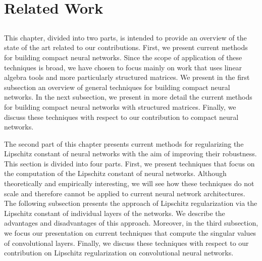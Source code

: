 \chapter{Related Work}
\label{chapter:ch3-related_work}
\localtoc

\section*{}

This chapter, divided into two parts, is intended to provide an overview of the state of the art related to our contributions.
First, we present current methods for building compact neural networks.
Since the scope of application of these techniques is broad, we have chosen to focus mainly on work that uses linear algebra tools and more particularly structured matrices. 
We present in the first subsection an overview of general techniques for building compact neural networks.
In the next subsection, we present in more detail the current methods for building compact neural networks with structured matrices.
Finally, we discuss these techniques with respect to our contribution to compact neural networks.

The second part of this chapter presents current methods for regularizing the Lipschitz constant of neural networks with the aim of improving their robustness.
This section is divided into four parts.
First, we present techniques that focus on the computation of the Lipschitz constant of neural networks.
Although theoretically and empirically interesting, we will see how these techniques do not scale and therefore cannot be applied to current neural network architectures.
The following subsection presents the approach of Lipschitz regularization via the Lipschitz constant of individual layers of the networks.
We describe the advantages and disadvantages of this approach.
Moreover, in the third subsection, we focus our presentation on current techniques that compute the singular values of convolutional layers.
Finally, we discuss these techniques with respect to our contribution on Lipschitz regularization on convolutional neural networks.




